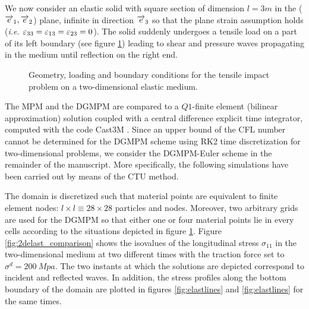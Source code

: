 We now consider an elastic solid with square section of dimension $l=3m$ in the (${\overrightarrow{e}}_1,{\overrightarrow{e}}_2$) plane, infinite in direction ${\overrightarrow{e}}_3$ so that the plane strain assumption holds (\textit{i.e. $\varepsilon_{33}=\varepsilon_{13}=\varepsilon_{23}=0$}). The solid suddenly undergoes a tensile load on a part of its left boundary (see figure \ref{fig:2D_planeStrain}) leading to shear and pressure waves propagating in the medium until reflection on the right end.
\begin{figure}[h!]
  \centering
   \qquad
  \caption{Geometry, loading and boundary conditions for the tensile impact problem on a two-dimensional elastic medium.}
  \label{fig:2D_planeStrain}
\end{figure}
The MPM and the DGMPM are compared to a $Q1$-finite element (bilinear approximation) solution coupled with a central difference explicit time integrator, computed with the code Cast3M \cite{Castem}.
Since an upper bound of the CFL number cannot be determined for the DGMPM scheme using RK2 time discretization for two-dimensional problems, we consider the DGMPM-Euler scheme in the remainder of the manuscript.
More specifically, the following simulations have been carried out by means of the CTU method.

The domain is discretized such that material points are equivalent to finite element nodes: $l\times l \equiv 28 \times 28$ particles and nodes. Moreover, two arbitrary grids are used for the DGMPM so that either one or four material points lie in every cells according to the situations depicted in figure \ref{fig:2D_planeStrain}.
Figure \ref{fig:2delast_comparison} shows the isovalues of the longitudinal stress $\sigma_{11}$ in the two-dimensional medium at two different times with the traction force set to $\sigma^d=200\: Mpa$.
The two instants at which the solutions are depicted correspond to incident and reflected waves. In addition, the stress profiles along the bottom boundary of the domain are plotted in figures \ref{fig:elastlines} and \ref{fig:elastlines} for the same times.

